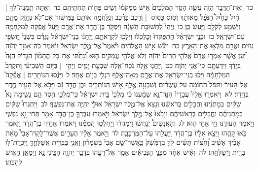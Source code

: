 \documentclass[18pt]{article}
\begin{document}
 {\loc כד~}וְאֶת־הַדָּבָ֥ר הַזֶּ֖ה עֲשֵׂ֑ה הָסֵ֤ר הַמְּלָכִים֙ אִ֣ישׁ מִמְּקֹמ֔וֹ וְשִׂ֥ים פַּח֖וֹת תַּחְתֵּיהֶֽם׃ \startlock
 {\loc כה~}וְאַתָּ֣ה תִֽמְנֶֽה־לְךָ֣  |  חַ֡יִל כַּחַ֩יִל֩ הַנֹּפֵ֨ל מֵאוֹתָ֜ךְ וְס֣וּס כַּסּ֣וּס  |  וְרֶ֣כֶב כָּרֶ֗כֶב וְנִֽלָּחֲמָ֤ה אוֹתָם֙ בַּמִּישׁ֔וֹר אִם־לֹ֥א נֶחֱזַ֖ק מֵהֶ֑ם וַיִּשְׁמַ֥ע לְקֹלָ֖ם וַיַּ֥עַשׂ כֵּֽן׃ \startlock
 {\loc כו~}וַֽיְהִי֙ לִתְשׁוּבַ֣ת הַשָּׁנָ֔ה וַיִּפְקֹ֥ד בֶּן־הֲדַ֖ד אֶת־אֲרָ֑ם וַיַּ֣עַל אֲפֵ֔קָה לַמִּלְחָמָ֖ה עִם־יִשְׂרָאֵֽל׃ \startlock
 {\loc כז~}וּבְנֵ֣י יִשְׂרָאֵ֗ל הׇתְפָּקְדוּ֙ וְכׇלְכְּל֔וּ וַיֵּלְכ֖וּ לִקְרָאתָ֑ם וַיַּחֲנ֨וּ בְנֵי־יִשְׂרָאֵ֜ל נֶגְדָּ֗ם כִּשְׁנֵי֙ חֲשִׂפֵ֣י עִזִּ֔ים וַאֲרָ֖ם מִלְא֥וּ אֶת־הָאָֽרֶץ׃ \startlock
 {\loc כח~}וַיִּגַּ֞שׁ אִ֣ישׁ הָאֱלֹהִ֗ים וַיֹּ֘אמֶר֮ אֶל־מֶ֣לֶךְ יִשְׂרָאֵל֒ וַיֹּ֜אמֶר כֹּֽה־אָמַ֣ר יְהֹוָ֗ה יַ֠עַן אֲשֶׁ֨ר אָמְר֤וּ אֲרָם֙ אֱלֹהֵ֤י הָרִים֙ יְהֹוָ֔ה וְלֹֽא־אֱלֹהֵ֥י עֲמָקִ֖ים ה֑וּא וְ֠נָתַתִּ֠י אֶת־כׇּל־הֶהָמ֨וֹן הַגָּ֤דוֹל הַזֶּה֙ בְּיָדֶ֔ךָ וִידַעְתֶּ֖ם כִּֽי־אֲנִ֥י יְהֹוָֽה׃ \startlock
 {\loc כט~}וַֽיַּחֲנ֧וּ אֵ֦לֶּה נֹכַח־אֵ֖לֶּה שִׁבְעַ֣ת יָמִ֑ים וַיְהִ֣י  |  בַּיּ֣וֹם הַשְּׁבִיעִ֗י וַתִּקְרַב֙ הַמִּלְחָמָ֔ה וַיַּכּ֨וּ בְנֵי־יִשְׂרָאֵ֧ל אֶת־אֲרָ֛ם מֵאָה־אֶ֥לֶף רַגְלִ֖י בְּי֥וֹם אֶחָֽד׃ \startlock
 {\loc ל~}וַיָּנֻ֨סוּ הַנּוֹתָרִ֥ים  |  אֲפֵ֘קָה֮ אֶל־הָעִיר֒ וַתִּפֹּל֙ הַחוֹמָ֔ה עַל־עֶשְׂרִ֨ים וְשִׁבְעָ֥ה אֶ֛לֶף אִ֖ישׁ הַנּוֹתָרִ֑ים וּבֶן־הֲדַ֣ד נָ֔ס וַיָּבֹ֥א אֶל־הָעִ֖יר חֶ֥דֶר בְּחָֽדֶר׃ \startlock
 {\loc לא~}וַיֹּאמְר֣וּ אֵלָיו֮ עֲבָדָיו֒ הִנֵּה־נָ֣א שָׁמַ֔עְנוּ כִּ֗י מַלְכֵי֙ בֵּ֣ית יִשְׂרָאֵ֔ל כִּֽי־מַלְכֵ֥י חֶ֖סֶד הֵ֑ם נָשִׂ֣ימָה נָּא֩ שַׂקִּ֨ים בְּמׇתְנֵ֜ינוּ וַחֲבָלִ֣ים בְּרֹאשֵׁ֗נוּ וְנֵצֵא֙ אֶל־מֶ֣לֶךְ יִשְׂרָאֵ֔ל אוּלַ֖י יְחַיֶּ֥ה אֶת־נַפְשֶֽׁךָ׃ \startlock
 {\loc לב~}וַיַּחְגְּרוּ֩ שַׂקִּ֨ים בְּמׇתְנֵיהֶ֜ם וַֽחֲבָלִ֣ים בְּרָאשֵׁיהֶ֗ם וַיָּבֹ֙אוּ֙ אֶל־מֶ֣לֶךְ יִשְׂרָאֵ֔ל וַיֹּ֣אמְר֔וּ עַבְדְּךָ֧ בֶן־הֲדַ֛ד אָמַ֖ר תְּחִי־נָ֣א נַפְשִׁ֑י וַיֹּ֛אמֶר הַעוֹדֶ֥נּוּ חַ֖י אָחִ֥י הֽוּא׃ \startlock
 {\loc לג~}וְהָאֲנָשִׁים֩ יְנַחֲשׁ֨וּ וַֽיְמַהֲר֜וּ וַיַּחְלְט֣וּ הֲמִמֶּ֗נּוּ וַיֹּאמְרוּ֙ אָחִ֣יךָ בֶן־הֲדַ֔ד וַיֹּ֖אמֶר בֹּ֣אוּ קָחֻ֑הוּ וַיֵּצֵ֤א אֵלָיו֙ בֶּן־הֲדַ֔ד וַֽיַּעֲלֵ֖הוּ עַל־הַמֶּרְכָּבָֽה׃ \startlock
 {\loc לד~}וַיֹּ֣אמֶר אֵלָ֡יו הֶעָרִ֣ים אֲשֶׁר־לָֽקַח־אָבִי֩ מֵאֵ֨ת אָבִ֜יךָ אָשִׁ֗יב וְ֠חֻצ֠וֹת תָּשִׂ֨ים לְךָ֤ בְדַמֶּ֙שֶׂק֙ כַּֽאֲשֶׁר־שָׂ֤ם אָבִי֙ בְּשֹׁ֣מְר֔וֹן וַאֲנִ֖י בַּבְּרִ֣ית אֲשַׁלְּחֶ֑ךָּ וַיִּכְרׇת־ל֥וֹ בְרִ֖ית וַֽיְשַׁלְּחֵֽהוּ׃ \startlock
 {\loc לה~}וְאִ֨ישׁ אֶחָ֜ד מִבְּנֵ֣י הַנְּבִיאִ֗ים אָמַ֧ר אֶל־רֵעֵ֛הוּ בִּדְבַ֥ר יְהֹוָ֖ה הַכֵּ֣ינִי נָ֑א וַיְמָאֵ֥ן הָאִ֖ישׁ לְהַכֹּתֽוֹ׃ \startlock
\end{document}
